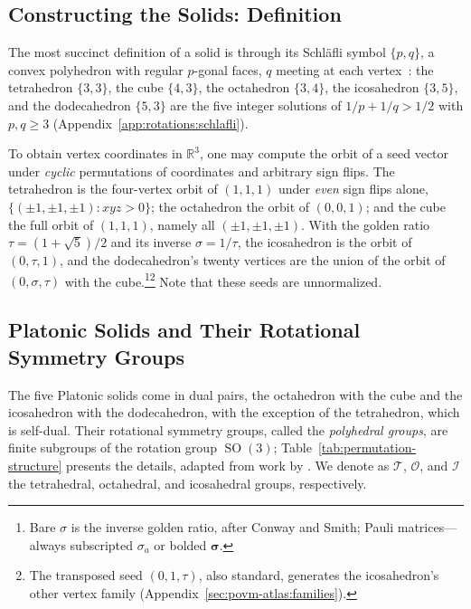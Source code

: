 \documentclass[11pt, oneside, openany]{scrbook}
\DeclareMathOperator{\SO}{SO}
\newcommand{\R}{\mathbb{R}}
\newcommand{\Tgroup}{\mathcal{T}}  %
\newcommand{\Ogroup}{\mathcal{O}}  %
\newcommand{\Igroup}{\mathcal{I}}  %
\newcommand{\phig}{\tau} %
\newcommand{\invphig}{\sigma} %
\begin{document}
\subsection{Constructing the Solids: Definition} \label{subsec:constructing-solids}

The most succinct definition of a solid is through its Schl\"{a}fli symbol $\{p, q\}$, a convex polyhedron with regular $p$-gonal faces, $q$ meeting at each vertex~\cite{coxeter1973regularpolytopes}: the tetrahedron $\{3,3\}$, the cube $\{4,3\}$, the octahedron $\{3,4\}$, the icosahedron $\{3,5\}$, and the dodecahedron $\{5,3\}$ are the five integer solutions of $1/p + 1/q > 1/2$ with $p, q \geq 3$ (Appendix~\ref{app:rotations:schlafli}).

To obtain vertex coordinates in $\R^3$, one may compute the orbit of a seed vector under \textit{cyclic} permutations of coordinates and arbitrary sign flips. The tetrahedron is the four-vertex orbit of $(1,1,1)$ under \textit{even} sign flips alone, $\{(\pm 1, \pm 1, \pm 1) : xyz > 0\}$; the octahedron the orbit of $(0,0,1)$; and the cube the full orbit of $(1,1,1)$, namely all $(\pm 1, \pm 1, \pm 1)$. With the golden ratio $\phig = (1+\sqrt{5})/2$ and its inverse $\invphig = 1/\phig$, the icosahedron is the orbit of $(0,\phig,1)$, and the dodecahedron's twenty vertices are the union of the orbit of $(0, \invphig, \phig)$ with the cube.\footnote{Bare $\invphig$ is the inverse golden ratio, after Conway and Smith; Pauli matrices---always subscripted $\sigma_a$ or bolded $\boldsymbol{\sigma}$.}\footnote{The transposed seed $(0,1,\phig)$, also standard, generates the icosahedron's other vertex family (Appendix~\ref{sec:povm-atlas:families}).} Note that these seeds are unnormalized.

\subsection{Platonic Solids and Their Rotational Symmetry Groups}

The five Platonic solids come in dual pairs, the octahedron with the cube and the icosahedron with the dodecahedron, with the exception of the tetrahedron, which is self-dual. Their rotational symmetry groups, called the \textit{polyhedral groups}, are finite subgroups of the rotation group $\SO(3)$; Table~\ref{tab:permutation-structure} presents the details, adapted from work by \textcite{vanhoboken2002platonicsolidsbinary}. We denote as $\Tgroup$, $\Ogroup$, and $\Igroup$ the tetrahedral, octahedral, and icosahedral groups, respectively.
\end{document}
